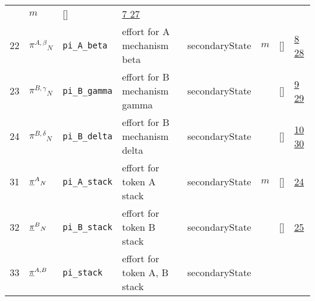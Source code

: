\begin{longtable}{|p{1cm}|p{3cm}|p{3cm}|p{7cm}|p{3.0cm}|p{3cm}|p{2cm}|p{1cm}|}
             & $ m  $
             & []
             & \hyperlink{"e:7"}{ 7 }
                 \hyperlink{"e:27"}{ 27 }
                 \\
    22
             & \hypertarget{"v:22"}{ $ {{\pi^{A,\beta}}}{_{N}} $}
             & \verb|pi_A_beta|
             & effort for A mechanism beta
             & \begin{lay}secondaryState \end{lay}
             & $ m  $
             & []
             & \hyperlink{"e:8"}{ 8 }
                 \hyperlink{"e:28"}{ 28 }
                 \\
    23
             & \hypertarget{"v:23"}{ $ {{\pi^{B,\gamma}}}{_{N}} $}
             & \verb|pi_B_gamma|
             & effort for B mechanism gamma
             & \begin{lay}secondaryState \end{lay}
             & $  $
             & []
             & \hyperlink{"e:9"}{ 9 }
                 \hyperlink{"e:29"}{ 29 }
                 \\
    24
             & \hypertarget{"v:24"}{ $ {{\pi^{B,\delta}}}{_{N}} $}
             & \verb|pi_B_delta|
             & effort for B mechanism delta
             & \begin{lay}secondaryState \end{lay}
             & $  $
             & []
             & \hyperlink{"e:10"}{ 10 }
                 \hyperlink{"e:30"}{ 30 }
                 \\
    31
             & \hypertarget{"v:31"}{ $ {{{{\protect\underline{\bf{\pi}}}}^A}}{_{N}} $}
             & \verb|pi_A_stack|
             & effort for token A stack
             & \begin{lay}secondaryState \end{lay}
             & $ m  $
             & []
             & \hyperlink{"e:24"}{ 24 }
                 \\
    32
             & \hypertarget{"v:32"}{ $ {{{{\protect\underline{\bf{\pi}}}}^B}}{_{N}} $}
             & \verb|pi_B_stack|
             & effort for token B stack
             & \begin{lay}secondaryState \end{lay}
             & $  $
             & []
             & \hyperlink{"e:25"}{ 25 }
                 \\
    33
             & \hypertarget{"v:33"}{ $ {{{{\protect\underline{\bf{\pi}}}}^{A,B}}}{_{}} $}
             & \verb|pi_stack|
             & effort for token A, B stack
             & \begin{lay}secondaryState \end{lay}

\end{longtable}
